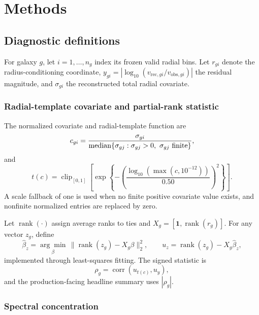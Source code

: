 
\section{Methods}
\label{sec:methods}

\subsection{Diagnostic definitions}
\label{sec:diagnostics}

For galaxy $g$, let $i=1,\ldots,n_g$ index its frozen valid radial bins. Let
$r_{gi}$ denote the radius-conditioning coordinate,
$y_{gi}=|\log_{10}(v_{\mathrm{rec},gi}/v_{\mathrm{obs},gi})|$ the residual
magnitude, and $\sigma_{gi}$ the reconstructed total radial covariate.

\subsubsection{Radial-template covariate and partial-rank statistic}

The normalized covariate and radial-template function are
\begin{equation}
c_{gi} =
\frac{\sigma_{gi}}
{\operatorname{median}\{\sigma_{gj}:\sigma_{gj}>0,\ \sigma_{gj}\ {\rm finite}\}},
\end{equation}
and
\begin{equation}
t(c)=\operatorname{clip}_{[0,1]}
\left[
\exp\left\{-\left(\frac{\log_{10}(\max(c,10^{-12}))}{0.50}\right)^2\right\}
\right].
\end{equation}
A scale fallback of one is used when no finite positive covariate value
exists, and nonfinite normalized entries are replaced by zero.

Let $\operatorname{rank}(\cdot)$ assign average ranks to ties and
$X_g=[\mathbf{1},\operatorname{rank}(r_g)]$. For any vector $z_g$, define
\begin{equation}
\widehat{\beta}_z=\underset{\beta}{\arg\min}\,
\|\operatorname{rank}(z_g)-X_g\beta\|_2^2,\qquad
u_z=\operatorname{rank}(z_g)-X_g\widehat{\beta}_z,
\end{equation}
implemented through least-squares fitting. The signed statistic is
\begin{equation}
\rho_g=\operatorname{corr}\left(u_{t(c)},u_y\right),
\end{equation}
and the production-facing headline summary uses $|\rho_g|$.

\subsubsection{Spectral concentration}

